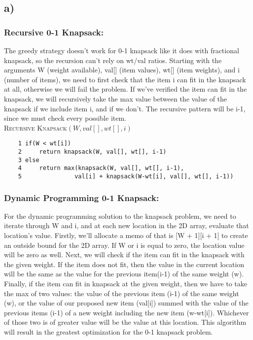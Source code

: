 \documentclass{article}
\begin{document}
\subsection*{a)}

\subsubsection*{Recursive 0-1 Knapsack:}

The greedy strategy doesn't work for 0-1 knapsack like it does with fractional knapsack, so the recursion can't rely on wt/val ratios.  Starting with the arguments W (weight available), val[] (item values), wt[] (item weights), and i (number of items), we need to first check that the item i can fit in the knapsack at all, otherwise we will fail the problem.  If we've verified the item can fit in the knapsack, we will recursively take the max value between the value of the knapsack if we include item i, and if we don't.  The recursive pattern will be i-1, since we must check every possible item.\\

\textsc{Recursive Knapsack$(W, val[], wt[], i)$}

\begin{verbatim}
    1 if(W < wt[i])
    2     return knapsack(W, val[], wt[], i-1)
    3 else
    4     return max(knapsack(W, val[], wt[], i-1),
    5               val[i] + knapsack(W-wt[i], val[], wt[], i-1))
\end{verbatim}

\subsubsection*{Dynamic Programming 0-1 Knapsack:}

For the dynamic programming solution to the knapsack problem, we need to iterate through W and i, and at each new location in the 2D array, evaluate that location's value.  Firstly, we'll allocate a memo of that is [W + 1][i + 1] to create an outside bound for the 2D array. If W or i is equal to zero, the location value will be zero as well.  Next, we will check if the item can fit in the knapsack with the given weight.  If the item does not fit, then the value in the current location will be the same as the value for the previous item(i-1) of the same weight (w).  Finally, if the item can fit in knapsack at the given weight, then we have to take the max of two values: the value of the previous item (i-1) of the same weight (w), or the value of our proposed new item (val[i]) summed with the value of the previous items (i-1) of a new weight including the new item (w-wt[i]).  Whichever of those two is of greater value will be the value at this location.  This algorithm will result in the greatest optimization for the 0-1 knapsack problem.\\
\end{document}
